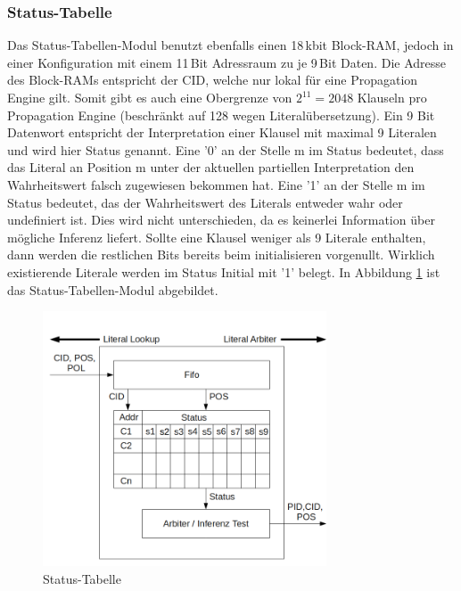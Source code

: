 \subsubsection{Status-Tabelle}
Das Status-Tabellen-Modul benutzt ebenfalls einen 18\,kbit Block-RAM,
jedoch in einer Konfiguration mit einem 11\,Bit Adressraum zu je
9\,Bit Daten. Die Adresse des Block-RAMs entspricht der CID, welche
nur lokal für eine Propagation Engine gilt. Somit gibt es auch
eine Obergrenze von $2^{11} = 2048$ Klauseln pro Propagation Engine
(beschränkt auf 128 wegen Literalübersetzung).
Ein 9 Bit Datenwort entspricht der Interpretation
einer Klausel mit maximal 9 Literalen und wird hier Status genannt. Eine '0' an der Stelle m 
im Status bedeutet, dass das Literal an Position m unter der aktuellen
partiellen Interpretation den Wahrheitswert falsch zugewiesen bekommen hat.
Eine '1' an der Stelle m im Status bedeutet, das der Wahrheitswert des
Literals entweder wahr oder undefiniert ist. Dies wird nicht
unterschieden, da es keinerlei Information über mögliche Inferenz
liefert. Sollte eine Klausel weniger als 9 Literale enthalten, 
dann werden die restlichen Bits bereits beim initialisieren
vorgenullt. Wirklich existierende Literale werden im Status
Initial mit '1' belegt. In Abbildung \ref{status_tabelle}
ist das Status-Tabellen-Modul abgebildet.
\begin{figure}[h]
  \includegraphics[width=0.75\textwidth]{abb/status_tabelle.png}
  \caption{Status-Tabelle}
  \label{status_tabelle}
\end{figure}

